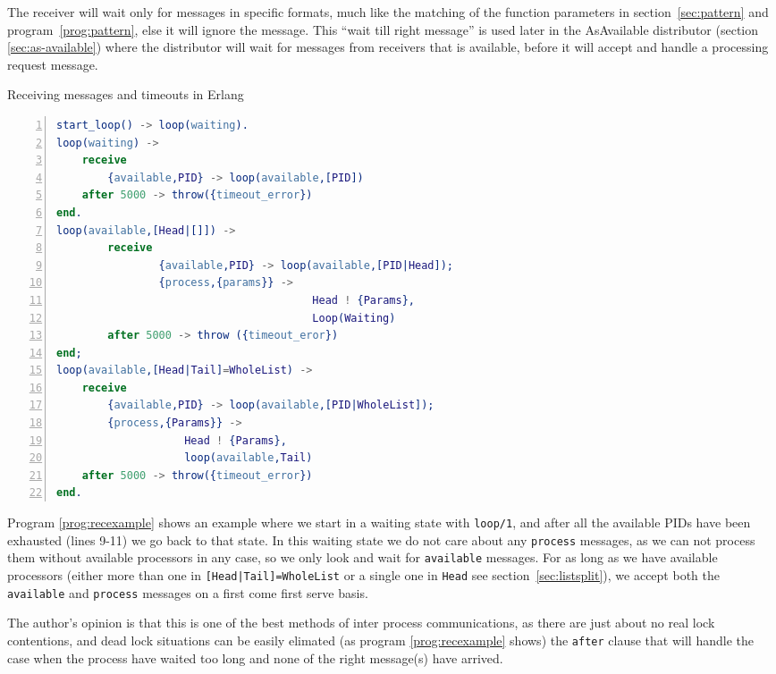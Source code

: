 \documentclass[a4paper,11pt]{report}
\begin{document}
The receiver will wait only for messages in specific formats, much
like the matching of the function parameters in
section~\ref{sec:pattern} and program~\ref{prog:pattern}, else it will
ignore the message. This ``wait till right message'' is used later in
the AsAvailable distributor (section \ref{sec:as-available}) where the
distributor will wait for messages from receivers that is available,
before it will accept and handle a processing request message.
\begin{Program}[tbh]
\caption{Receiving messages and timeouts in Erlang}
\label{prog:recexample}
\begin{lstlisting}[language=erlang,numbers=left,numberstyle=\tiny]
start_loop() -> loop(waiting).
loop(waiting) ->
	receive
		{available,PID} -> loop(available,[PID])
	after 5000 -> throw({timeout_error})
end.
loop(available,[Head|[]]) ->
        receive
                {available,PID} -> loop(available,[PID|Head]);
                {process,{params}} ->
                                        Head ! {Params},
                                        Loop(Waiting)
        after 5000 -> throw ({timeout_eror})
end;
loop(available,[Head|Tail]=WholeList) ->
	receive
		{available,PID} -> loop(available,[PID|WholeList]);
		{process,{Params}} ->
					Head ! {Params},
					loop(available,Tail)
	after 5000 -> throw({timeout_error})
end.
\end{lstlisting}
\end{Program} Program \ref{prog:recexample} shows an example where we
start in a waiting state with \texttt{loop/1}, and after all the
available PIDs have been exhausted (lines 9-11) we go back to that
state. In this waiting state we do not care about any \texttt{process}
messages, as we can not process them without available processors in any case, so we only look and
wait for \texttt{available} messages. For as long as we have available
processors (either more than one in \texttt{[Head|Tail]=WholeList} or
a single one in \texttt{Head} see section~\ref{sec:listsplit}), we accept both the
\texttt{available} and \texttt{process} messages on a first come first
serve basis.



The author's opinion is that this is one of the best methods of inter process
communications, as there are just about no real lock contentions, and dead
lock situations can be easily elimated (as program \ref{prog:recexample}
shows) the \texttt{after} clause that will handle the case when the
process have waited too long and none of the right message(s) have arrived.
\end{document}
